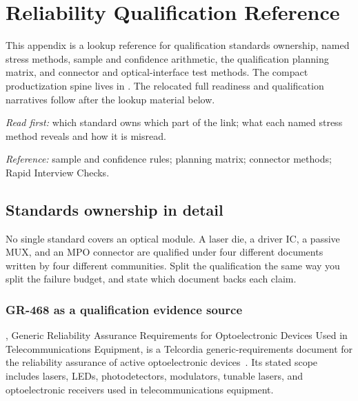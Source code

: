 \chapter{Reliability Qualification Reference}
\label{app:reliability-reference}

This appendix is a lookup reference for qualification standards ownership,
named stress methods, sample and confidence arithmetic, the qualification
planning matrix, and connector and optical-interface test methods. The compact
productization spine lives in . The
relocated full readiness and qualification narratives follow after the lookup
material below.

\textit{Read first:} which standard owns which part of the link; what each
named stress method reveals and how it is misread.

\textit{Reference:} sample and confidence rules; planning matrix; connector
methods; Rapid Interview Checks.

\section{Standards ownership in detail}

No single standard covers an optical module. A laser die, a driver IC, a
passive MUX, and an MPO connector are qualified under four different documents
written by four different communities. Split the qualification the same way you
split the failure budget, and state which document backs each claim.

\subsection{GR-468 as a qualification evidence source}
\label{sec:gr468}

, Generic Reliability Assurance Requirements for
Optoelectronic Devices Used in Telecommunications Equipment, is a Telcordia
generic-requirements document for the reliability assurance of active
optoelectronic devices~. Its stated scope includes lasers,
LEDs, photodetectors, modulators, tunable lasers, and optoelectronic receivers
used in telecommunications equipment.

